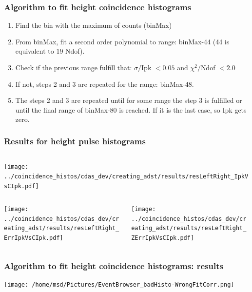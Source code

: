 \documentclass[aspectratio=169]{beamer}
\begin{document}
\begin{frame}
  \frametitle{Algorithm to fit height coincidence histograms}
  \begin{enumerate}
    \item Find the bin with the maximum of counts (binMax)           
    \item From binMax, fit a second order polynomial to range:
      binMax-44 (44 is equivalent to 19 Ndof).
    \item Check if the previous range fulfill that: $\sigma/$Ipk
      $<0.05$ and $\chi^2/$Ndof $<2.0$
    \item If not, steps 2 and 3 are repeated for the range:
      binMax-48.
    \item The steps 2 and 3 are repeated until for some range the
      step 3 is fulfilled or until the final range of binMax-80
      is reached. If it is the last case, so Ipk gets zero.
  \end{enumerate}
\end{frame}


\begin{frame}
  \frametitle{Results for height pulse histograms}

  \begin{columns}
    \centering
    \begin{column}{0.5\textwidth}
      \texttt{[image: ../coincidence\_histos/cdas\_dev/creating\_adst/results/resLeftRight\_IpkVsCIpk.pdf]}
    \end{column}
  \end{columns}

  \begin{columns}
    \centering
    \begin{column}{0.5\textwidth}
      \texttt{[image: ../coincidence\_histos/cdas\_dev/creating\_adst/results/resLeftRight\_ErrIpkVsCIpk.pdf]}
    \end{column}
    \begin{column}{0.5\textwidth}
      \texttt{[image: ../coincidence\_histos/cdas\_dev/creating\_adst/results/resLeftRight\_ZErrIpkVsCIpk.pdf]}
    \end{column}
  \end{columns}
\end{frame}


\begin{frame}
  \frametitle{Algorithm to fit height coincidence histograms:
  results}
  \begin{center}
    \texttt{[image: /home/msd/Pictures/EventBrowser\_badHisto-WrongFitCorr.png]}
  \end{center}
\end{frame}
\end{document}
